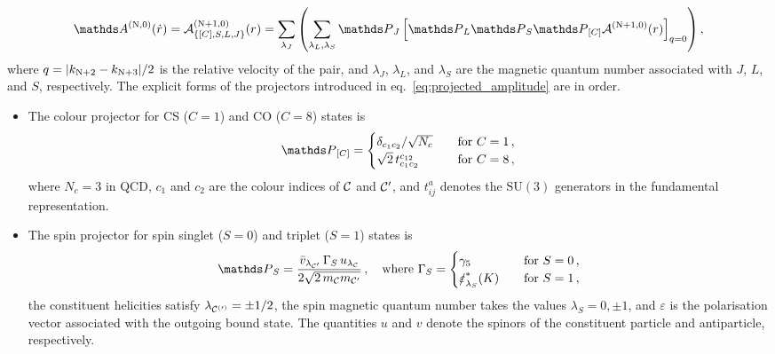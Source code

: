 \begin{equation}
    {\mathds A}^{({\rm N},0)}(\dot{r}) = {\cal A}^{({\rm N}+1,0)}_{\left\{[C],S,L,J\right\}}(r) = \sum_{\lambda_J} \left(\sum_{\lambda_L,\lambda_S} {\mathds P}_J \left[ {\mathds P}_L {\mathds P}_S {\mathds P}_{[C]} {\cal A}^{({\rm N}+1,0)}(r)\right]_{q = 0} \right),
    \label{eq:projected_amplitude}
\end{equation}
where $q = |k_{{\rm N}+2} - k_{{\rm N}+3}|/2$ is the relative velocity of the pair, and $\lambda_J$, $\lambda_L$, and $\lambda_S$ are the magnetic quantum number associated with $J$, $L$, and $S$, respectively.
The explicit forms of the projectors introduced in eq.~\eqref{eq:projected_amplitude} are in order.
\begin{itemize}
    \item
    The colour projector for CS ($C=1$) and CO ($C=8$) states is
        \begin{equation}
            {\mathds P}_{[C]} =
                \begin{cases}
                    \delta_{c_1 c_2}/\sqrt{N_c} & \quad {\rm for}\ C=1\,, \\
                    \sqrt{2}\, t_{c_1 c_2}^{c_{12}} & \quad {\rm for}\ C=8\,, \\
                \end{cases}
        \label{eq:proj_colour2}
        \end{equation}
        where $N_c = 3$ in QCD, $c_1$ and $c_2$ are the colour indices of ${\cal C}$ and ${\cal C}^\prime$, and $t_{ij}^a$ denotes the $\mathrm{SU}(3)$ generators in the fundamental representation.
    \item
    The spin projector for spin singlet ($S=0$) and triplet ($S=1$) states is
        \begin{equation}
            {\mathds P}_{S} = \dfrac{\bar{v}_{\lambda_{{\cal C}^\prime}}\, \Gamma_S\, u_{\lambda_{{\cal C}}}}{2 \sqrt{2\, m_{{\cal C}} m_{{\cal C}^\prime}}}\,,\quad {\rm where}\ \Gamma_S =
            \begin{cases}
                \gamma_5 & \quad {\rm for}\ S=0\,, \\
                \slashed{\varepsilon}_{\lambda_S}^*(K) & \quad {\rm for}\ S=1\,, \\
            \end{cases}
        \label{eq:proj_spin2}
        \end{equation}
        the constituent helicities satisfy $\lambda_{{\cal C^{(\prime)}}} = \pm 1/2$, the spin magnetic quantum number takes the values $\lambda_S=0,\pm1$, and $\varepsilon$ is the polarisation vector associated with the outgoing bound state. The quantities $u$ and $v$ denote the spinors of the constituent particle and antiparticle, respectively.

\end{itemize}
